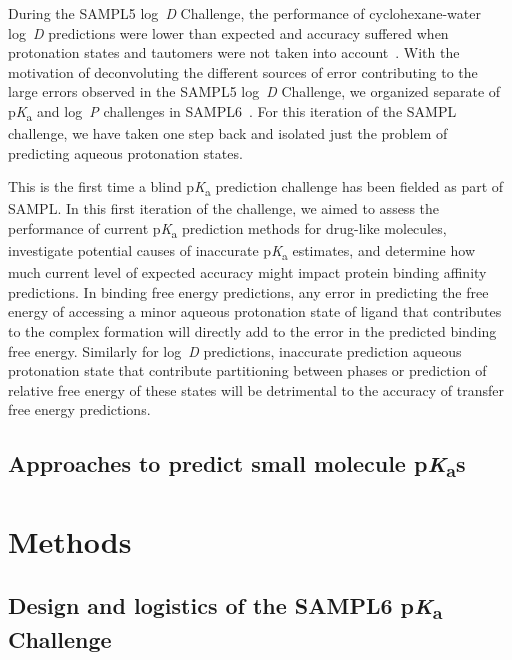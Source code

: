 \documentclass[9pt,lineno,final]{elife}
\newcommand{\pKa}{p\textit{K}\textsubscript{a}}
\newcommand{\logD}{log~\textit{D}}
\newcommand{\logP}{log~\textit{P}}
\begin{document}
During the SAMPL5 \logD{} Challenge, the performance of cyclohexane-water \logD{} predictions were lower than expected and accuracy suffered when protonation states and tautomers were not taken into account~\citep{Pickard:2016:J.Comput.AidedMol.Des., Bannan:2018:J.Comput.AidedMol.Des.}. 
With the motivation of deconvoluting the different sources of error contributing to the large errors observed in the SAMPL5 \logD{} Challenge, we organized separate of \pKa{} and \logP{} challenges in SAMPL6~\citep{Isik:2018:J.Comput.AidedMol.Des., Isik:2020:J.Comput.AidedMol.Des., Isik:2020:J.Comput.AidedMol.Des.a}. For this iteration of the SAMPL challenge, we have taken one step back and isolated just the problem of predicting aqueous protonation states. 

This is the first time a blind \pKa{} prediction challenge has been fielded as part of SAMPL. 
In this first iteration of the challenge, we aimed to assess the performance of current \pKa{} prediction methods for drug-like molecules, investigate potential causes of inaccurate \pKa{} estimates, and determine how much current level of expected accuracy might impact protein binding affinity predictions. 
In binding free energy predictions, any error in predicting the free energy of accessing a minor aqueous protonation state of ligand that contributes to the complex formation will directly add to the error in the predicted binding free energy. 
Similarly for \logD{} predictions, inaccurate prediction aqueous protonation state that contribute partitioning between phases or prediction of relative free energy of these states will be detrimental to the accuracy of transfer free energy predictions.

\subsection{Approaches to predict small molecule \pKa{}s}



\section{Methods}

\subsection{Design and logistics of the SAMPL6 \pKa{} Challenge}
\end{document}
